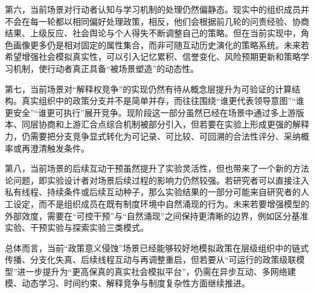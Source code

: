 \documentclass{article}
\begin{document}
第六，当前场景对行动者认知与学习机制的处理仍然偏静态。现实中的组织成员并不会在每一轮都以相同偏好处理政策，相反，他们会根据前几轮的问责经验、协商结果、上级反应、社会舆论与个人得失不断调整自己的策略。但在当前实现中，角色画像更多仍是相对固定的属性集合，而非可随互动历史演化的策略系统。未来若希望增强社会模拟真实性，可以引入记忆累积、信誉变化、风险预期更新和策略学习机制，使行动者真正具备“被场景塑造”的动态性。

第七，当前场景对“解释权竞争”的实现仍然有待从概念层提升为可验证的计算结构。真实组织中的政策分支并不是简单并存，而往往围绕“谁更代表领导意图”“谁更安全”“谁更可执行”展开竞争。现阶段这一部分虽然已经在场景中通过多上游版本、同层协商和上游汇合点综合机制被部分引入，但若要在实验上形成更强的解释力，仍需要把分支竞争显式转化为可记录、可比较、可回溯的合法性评分、采纳概率或再澄清触发条件。

第八，当前场景的后续互动干预虽然提升了实验灵活性，但也带来了一个新的方法论问题，即实验设计者对场景后续过程的影响力仍然较强。若研究者可以直接注入私有线程、持续条件或后续互动种子，那么实验结果的一部分可能来自研究者的人工设定，而不是组织成员在既有制度环境中自然涌现的行为。未来若要增强模型的外部效度，需要在“可控干预”与“自然涌现”之间保持更清晰的边界，例如区分基准实验、干预实验与探索实验三类模式。

总体而言，当前“政策意义侵蚀”场景已经能够较好地模拟政策在层级组织中的链式传播、分支化失真、后续线程互动与再调整重启，但若要从“可运行的政策级联模型”进一步提升为“更高保真的真实社会模拟平台”，仍需在异步互动、多网络建模、动态学习、时间约束、解释竞争与制度复杂性方面继续推进。



\end{document}
